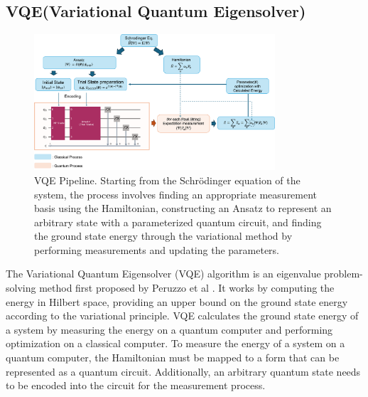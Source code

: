 \documentclass[pdflatex,sn-mathphys-num]{sn-jnl}%
\theoremstyle{thmstyleone}%
\theoremstyle{thmstyletwo}%
\theoremstyle{thmstylethree}%
\begin{document}
\subsection{VQE(Variational Quantum Eigensolver)}\label{subsec2.2}
\begin{figure}[htbp]
\centering
\includegraphics[width=0.8\textwidth]{fig/VQE_pipeline.png}
\caption{VQE Pipeline. Starting from the Schrödinger equation of the system, the process involves finding an appropriate measurement basis using the Hamiltonian, constructing an Ansatz to represent an arbitrary state with a parameterized quantum circuit, and finding the ground state energy through the variational method by performing measurements and updating the parameters.}\label{Fig.2}
\end{figure}

The Variational Quantum Eigensolver (VQE) algorithm is an eigenvalue problem-solving method first proposed by Peruzzo et al \cite{VQE1}. It works by computing the energy in Hilbert space, providing an upper bound on the ground state energy according to the variational principle. VQE calculates the ground state energy of a system by measuring the energy on a quantum computer and performing optimization on a classical computer. To measure the energy of a system on a quantum computer, the Hamiltonian must be mapped to a form that can be represented as a quantum circuit. Additionally, an arbitrary quantum state needs to be encoded into the circuit for the measurement process.
\end{document}

